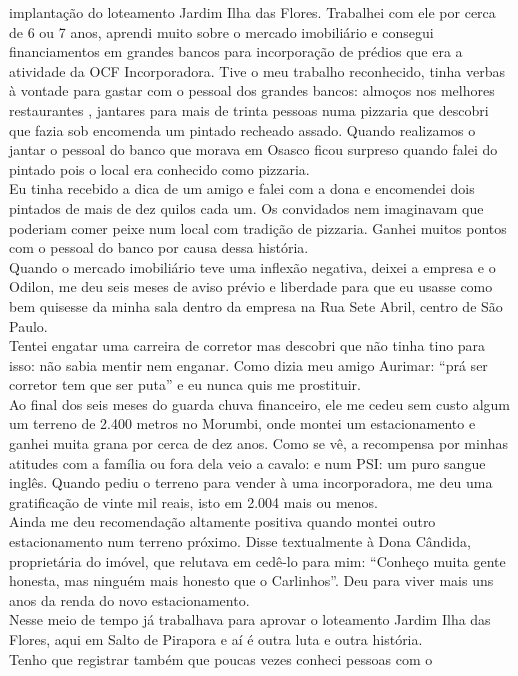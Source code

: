 \documentclass[12pt,brazil,]{book}
\begin{document}
implantação do loteamento Jardim Ilha das Flores. Trabalhei com ele por
cerca de 6 ou 7 anos, aprendi muito sobre o mercado imobiliário e
consegui financiamentos em grandes bancos para incorporação de prédios
que era a atividade da OCF Incorporadora. Tive o meu trabalho
reconhecido, tinha verbas à vontade para gastar com o pessoal dos
grandes bancos: almoços nos melhores restaurantes , jantares para mais
de trinta pessoas numa pizzaria que descobri que fazia sob encomenda um
pintado recheado assado. Quando realizamos o jantar o pessoal do banco
que morava em Osasco ficou surpreso quando falei do pintado pois o local
era conhecido como pizzaria.\\
Eu tinha recebido a dica de um amigo e falei com a dona e encomendei
dois pintados de mais de dez quilos cada um. Os convidados nem
imaginavam que poderiam comer peixe num local com tradição de pizzaria.
Ganhei muitos pontos com o pessoal do banco por causa dessa história.\\
Quando o mercado imobiliário teve uma inflexão negativa, deixei a
empresa e o Odilon, me deu seis meses de aviso prévio e liberdade para
que eu usasse como bem quisesse da minha sala dentro da empresa na Rua
Sete Abril, centro de São Paulo.\\
Tentei engatar uma carreira de corretor mas descobri que não tinha tino
para isso: não sabia mentir nem enganar. Como dizia meu amigo Aurimar:
``prá ser corretor tem que ser puta'' e eu nunca quis me prostituir.\\
Ao final dos seis meses do guarda chuva financeiro, ele me cedeu sem
custo algum um terreno de 2.400 metros no Morumbi, onde montei um
estacionamento e ganhei muita grana por cerca de dez anos. Como se vê, a
recompensa por minhas atitudes com a família ou fora dela veio a cavalo:
e num PSI: um puro sangue inglês. Quando pediu o terreno para vender à
uma incorporadora, me deu uma gratificação de vinte mil reais, isto em
2.004 mais ou menos.\\
Ainda me deu recomendação altamente positiva quando montei outro
estacionamento num terreno próximo. Disse textualmente à Dona Cândida,
proprietária do imóvel, que relutava em cedê-lo para mim: ``Conheço
muita gente honesta, mas ninguém mais honesto que o Carlinhos''. Deu
para viver mais uns anos da renda do novo estacionamento.\\
Nesse meio de tempo já trabalhava para aprovar o loteamento Jardim Ilha
das Flores, aqui em Salto de Pirapora e aí é outra luta e outra
história.\\
Tenho que registrar também que poucas vezes conheci pessoas com o
\end{document}
